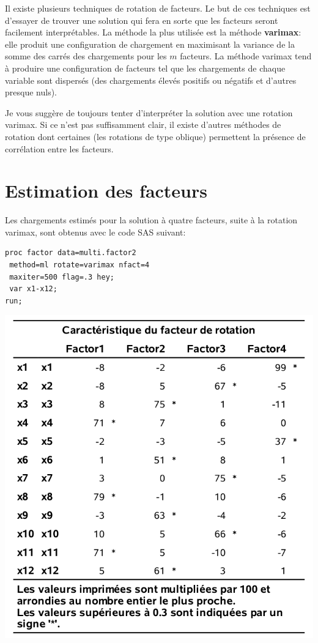 \documentclass[
]{book}
\theoremstyle{definition}
\theoremstyle{definition}
\theoremstyle{definition}
\theoremstyle{remark}
\begin{document}
Il existe plusieurs techniques de rotation de facteurs. Le but de ces techniques est d'essayer de trouver une solution qui fera en sorte que les facteurs seront facilement interprétables. La méthode la plus utilisée est la méthode \textbf{varimax}: elle produit une configuration de chargement en maximisant la variance de la somme des carrés des chargements pour les \(m\) facteurs. La méthode varimax tend à produire une configuration de facteurs tel que les chargements de chaque variable sont dispersés (des chargements élevés positifs ou négatifs et d'autres presque nuls).

Je vous suggère de toujours tenter d'interpréter la solution avec une rotation varimax. Si ce n'est pas suffisamment clair, il existe d'autres méthodes de rotation dont certaines (les rotations de type oblique) permettent la présence de corrélation entre les facteurs.

\hypertarget{estimation-des-facteurs}{%
\section{Estimation des facteurs}\label{estimation-des-facteurs}}

Les chargements estimés pour la solution à quatre facteurs, suite à la rotation varimax, sont obtenus avec le code SAS suivant:

\begin{verbatim}
proc factor data=multi.factor2 
 method=ml rotate=varimax nfact=4
 maxiter=500 flag=.3 hey;
 var x1-x12;
run;
\end{verbatim}

\begin{center}\includegraphics[width=0.7\linewidth]{figures/01-facto-e3} \end{center}
\end{document}
